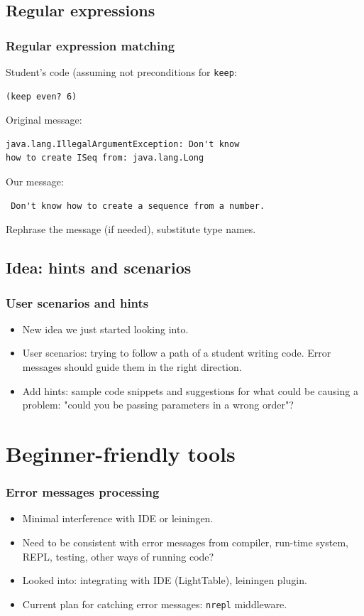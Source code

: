 \documentclass{beamer}
\begin{document}
\subsection{Regular expressions}
\begin{frame}[fragile]
 \frametitle {Regular expression matching}
Student's code (assuming not preconditions for {\tt keep}:
\begin{verbatim}
(keep even? 6)
\end{verbatim}
Original message:
\begin{verbatim}
java.lang.IllegalArgumentException: Don't know 
how to create ISeq from: java.lang.Long
\end{verbatim}
Our message:
\begin{verbatim}
 Don't know how to create a sequence from a number. 
\end{verbatim}
Rephrase the message (if needed), substitute type names. 
\end{frame}


\subsection{Idea: hints and scenarios}

\begin{frame}
   \frametitle{User scenarios and hints}
\begin{itemize}
\item New idea we just started looking into.
\item User scenarios: trying to follow a path of a student writing code. Error messages should guide them in the right direction.
\item Add hints: sample code snippets and suggestions for what could be causing a problem: "could you be passing parameters in a wrong order"? 
\end{itemize}
\end{frame}

\section{Beginner-friendly tools}

\begin{frame}
   \frametitle{Error messages processing}
\begin{itemize}
\item Minimal interference with IDE or leiningen.
\item Need to be consistent with error messages from compiler,  run-time system, REPL, testing, other ways of running code?
\item Looked into: integrating with IDE (LightTable), leiningen plugin. 
\item Current plan for catching error messages: {\tt nrepl} middleware. 
\end{itemize}
\end{frame}
\end{document}
